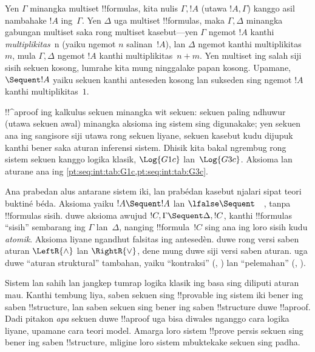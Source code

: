 \documentclass[../../../include/open-logic-section]{subfiles}
\begin{document}
Yen $\Gamma$ minangka multiset !!{formula}s, kita nulis
$\Gamma, !A$ (utawa $!A, \Gamma$) kanggo asil nambahake
$!A$ ing~$\Gamma$. Yen $\Delta$ uga multiset !!{formula}s,
maka $\Gamma, \Delta$ minangka gabungan multiset saka rong
multiset kasebut---yen $\Gamma$ ngemot $!A$ kanthi
\emph{multiplikitas}~n (yaiku ngemot $n$ salinan~$!A$), lan
$\Delta$ ngemot kanthi multiplikitas~$m$, mula
$\Gamma, \Delta$ ngemot $!A$ kanthi multiplikitas~$n+m$.
Yen multiset ing salah siji sisih sekuen kosong, lumrahe
kita mung ninggalake papan kosong. Upamane, $\Sequent !A$
yaiku sekuen kanthi anteseden kosong lan sukseden sing
ngemot $!A$ kanthi multiplikitas~$1$.

!!^a{proof} ing kalkulus sekuen minangka wit sekuen: sekuen
paling ndhuwur (utawa sekuen awal) minangka aksioma ing
sistem sing digunakake; yen sekuen ana ing sangisore siji
utawa rong sekuen liyane, sekuen kasebut kudu dijupuk kanthi
bener saka aturan inferensi sistem. Dhisik kita bakal
ngrembug rong sistem sekuen kanggo logika klasik,
$\Log{G1c}$ lan~$\Log{G3c}$. Aksioma lan aturane ana ing
\cref{pt:seq:int:tab:G1c,pt:seq:int:tab:G3c}.




Ana prabedan alus antarane sistem iki, lan prabédan kasebut
njalari sipat teori buktiné béda. Aksioma  yaiku $!A \Sequent !A$ lan $\lfalse \Sequent \quad$,
tanpa !!{formula}s sisih.  duwe
aksioma awujud $!C, \Gamma \Sequent \Delta, !C$, kanthi
!!{formula}s ``sisih'' sembarang ing $\Gamma$ lan~$\Delta$,
nanging !!{formula}~$!C$ sing ana ing loro sisih kudu
\emph{atomik}. Aksioma liyane ngandhut falsitas ing antesedèn.
 duwe rong versi saben aturan
$\LeftR{\land}$ lan $\RightR{\lor}$, dene  mung
duwe siji versi saben aturan.  uga duwe ``aturan
struktural'' tambahan, yaiku ``kontraksi''
(\LeftR{\Contraction}, \RightR{\Contraction}) lan
``pelemahan'' (\LeftR{\Weakening}, \RightR{\Weakening}).

Sistem  lan  sahih lan jangkep tumrap
logika klasik ing basa sing diliputi aturan mau. Kanthi tembung liya, saben sekuen sing
!!{provable} ing sistem iki bener ing saben !!{structure},
lan saben sekuen sing bener ing saben !!{structure} duwe
!!a{proof}. Dadi pitakon \emph{apa} sekuen duwe !!a{proof}
uga bisa diwales nganggo cara logika liyane, upamane cara
teori model. Amarga loro sistem !!{prove} persis sekuen
sing bener ing saben !!{structure}, mligine loro sistem
mbuktekake sekuen sing padha.
\end{document}
